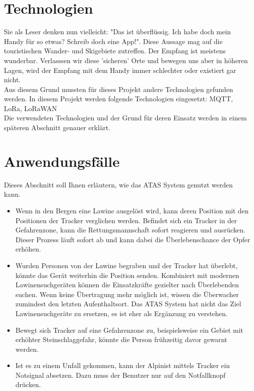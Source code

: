 \documentclass[11pt,english,german]{report}
\theoremstyle{definition}
\begin{document}
\section{Technologien}
Sie als Leser denken nun vielleicht: "Das ist überflüssig. Ich habe doch mein Handy für so etwas? Schreib doch eine App!". Diese Aussage mag auf die touristischen Wander- und Skigebiete zutreffen. Der Empfang ist meistens wunderbar. Verlasssen wir diese 'sicheren' Orte und bewegen uns aber in höheren Lagen, wird der Empfang mit dem Handy immer schlechter oder existiert gar nicht. \bigskip \\
Aus diesem Grund mussten für dieses Projekt andere Technologien gefunden werden. In diesem Projekt werden folgende Technologien eingesetzt:
MQTT, LoRa, LoRaWAN\bigskip \\
Die verwendeten Technologien und der Grund für deren Einsatz werden in einem späteren Abschnitt genauer erklärt.

\section{Anwendungsfälle}
Dieses Abschnitt soll Ihnen erläutern, wie das ATAS System genutzt werden kann.
\begin{itemize}
	\item 
	Wenn in den Bergen eine Lawine ausgelöst wird, kann deren Position mit den Positionen der Tracker verglichen werden. Befindet sich ein Tracker in der Gefahrenzone, kann die Rettungsmannschaft sofort reagieren und ausrücken. Dieser Prozess läuft sofort ab und kann dabei die Überlebenschance der Opfer erhöhen. 
	\item 
	Wurden Personen von der Lawine begraben und der Tracker hat überlebt, könnte das Gerät weiterhin die Position senden. Kombiniert mit modernen Lawinensuchgeräten können die Einsatzkräfte gezielter nach Überlebenden suchen. Wenn keine Übertragung mehr möglich ist, wissen die Überwacher zumindest den letzten Aufenthaltsort. Das ATAS System hat nicht das Ziel Lawinensuchgeräte zu ersetzen, es ist eher als Ergänzung zu verstehen. 
	\item 
	Bewegt sich Tracker auf eine Gefahrenzone zu, beispielsweise ein Gebiet mit erhöhter Steinschlaggefahr, könnte die Person frühzeitig davor gewarnt werden. 
	\item 
	Ist es zu einem Unfall gekommen, kann der Alpinist mittels Tracker ein Notsignal absetzen. Dazu muss der Benutzer nur auf den Notfallknopf drücken.
\end{itemize}
\end{document}
